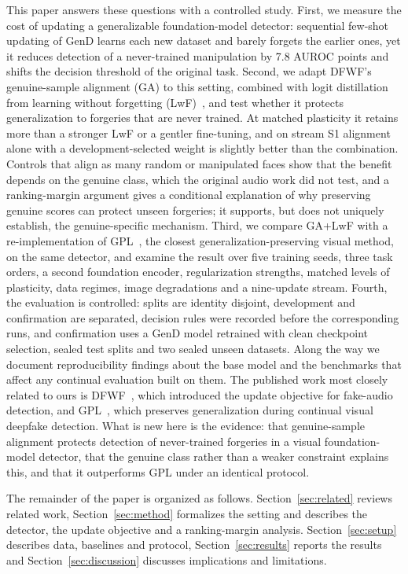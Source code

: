 \documentclass[journal]{IEEEtran}
\begin{document}
This paper answers these questions with a controlled study. First, we measure the cost of updating a generalizable foundation-model detector: sequential few-shot updating of GenD learns each new dataset and barely forgets the earlier ones, yet it reduces detection of a never-trained manipulation by 7.8 AUROC points and shifts the decision threshold of the original task. Second, we adapt DFWF's genuine-sample alignment (GA) to this setting, combined with logit distillation from learning without forgetting (LwF)~\cite{li2018lwf}, and test whether it protects generalization to forgeries that are never trained. At matched plasticity it retains more than a stronger LwF or a gentler fine-tuning, and on stream S1 alignment alone with a development-selected weight is slightly better than the combination. Controls that align as many random or manipulated faces show that the benefit depends on the genuine class, which the original audio work did not test, and a ranking-margin argument gives a conditional explanation of why preserving genuine scores can protect unseen forgeries; it supports, but does not uniquely establish, the genuine-specific mechanism. Third, we compare GA+LwF with a re-implementation of GPL~\cite{zhang2025gpl}, the closest generalization-preserving visual method, on the same detector, and examine the result over five training seeds, three task orders, a second foundation encoder, regularization strengths, matched levels of plasticity, data regimes, image degradations and a nine-update stream. Fourth, the evaluation is controlled: splits are identity disjoint, development and confirmation are separated, decision rules were recorded before the corresponding runs, and confirmation uses a GenD model retrained with clean checkpoint selection, sealed test splits and two sealed unseen datasets. Along the way we document reproducibility findings about the base model and the benchmarks that affect any continual evaluation built on them. The published work most closely related to ours is DFWF~\cite{ma2021dfwf}, which introduced the update objective for fake-audio detection, and GPL~\cite{zhang2025gpl}, which preserves generalization during continual visual deepfake detection. What is new here is the evidence: that genuine-sample alignment protects detection of never-trained forgeries in a visual foundation-model detector, that the genuine class rather than a weaker constraint explains this, and that it outperforms GPL under an identical protocol.

The remainder of the paper is organized as follows. Section~\ref{sec:related} reviews related work, Section~\ref{sec:method} formalizes the setting and describes the detector, the update objective and a ranking-margin analysis. Section~\ref{sec:setup} describes data, baselines and protocol, Section~\ref{sec:results} reports the results and Section~\ref{sec:discussion} discusses implications and limitations.
\end{document}
